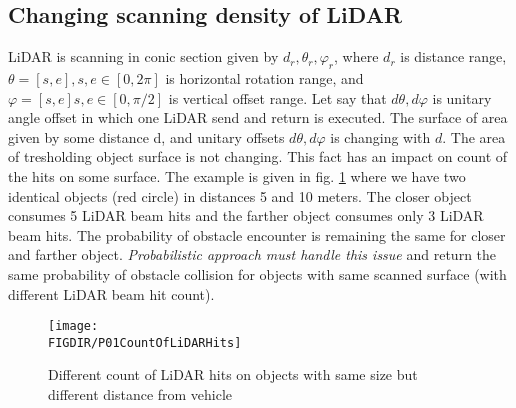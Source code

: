 \subsection{Changing scanning density of LiDAR}
\noindent LiDAR is scanning in conic section given by $d_r,\theta_r,\varphi_r$, where $d_r$ is distance range, $\theta=[s,e],s,e\in [0,2\pi]$ is horizontal rotation range, and $\varphi=[s,e] s,e\in[0,\pi/2]$ is vertical offset range. Let say that $d\theta, d\varphi$ is unitary angle offset in which one LiDAR send and return is executed. The surface of area given by some distance d, and unitary offsets $d\theta, d\varphi$ is changing with $d$. The area of tresholding object surface is not changing. This fact has an impact on count of the hits on some surface. The example is given in fig. \ref{fig:P01CountOfLiDARHits} where we have two identical objects (red circle) in distances 5 and 10 meters. The closer object consumes 5 LiDAR beam hits and the farther object consumes only 3 LiDAR beam hits. The probability of obstacle encounter is remaining the same for closer and farther object. \emph{Probabilistic approach must handle this issue} and return the same probability of obstacle collision for objects with same scanned surface (with different LiDAR beam hit count).

\begin{figure}[htbp]
    \centering
    \texttt{[image: \\FIGDIR/P01CountOfLiDARHits]}
    \caption{Different count of LiDAR hits on objects with same size but different distance from vehicle}
    \label{fig:P01CountOfLiDARHits}
\end{figure}

